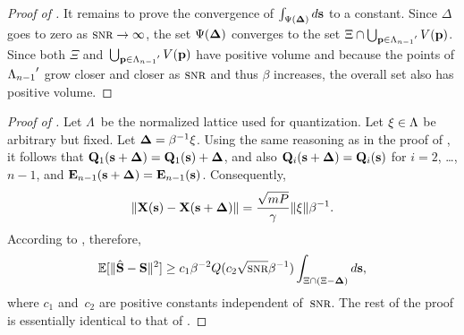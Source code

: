 \begin{subappendices}
\begin{proof}[Proof of ]
    It remains to prove the convergence of $\int_{\Psi(\mathbf{\Delta})} d\mathbf{s}$ to a constant.
    Since $\Delta$ goes to zero as $\snr \goesto \infty$, the set $\Psi(\mathbf{\Delta})$
    converges to the set $\Xi \cap \bigcup_{\mathbf{p} \in {\Lambda_{n-1}}'} V(\mathbf{p})$. Since both
    $\Xi$ and~$\bigcup_{\mathbf{p} \in {\Lambda_{n-1}}'} V(\mathbf{p})$ have positive volume and because the
    points of ${\Lambda_{n-1}}'$ grow closer and closer as $\snr$ and thus $\beta$
    increases, the overall set also has positive volume.
  \end{proof}


  \begin{proof}[Proof of ]
    Let $\Lambda$~be the normalized lattice used for quantization. Let $\mathbf{\xi} \in
    \Lambda$ be arbitrary but fixed. Let $\mathbf{\Delta} = \beta^{-1} \mathbf{\xi}$. Using the same
    reasoning as in the proof of , it follows that $\mathbf{Q}_1(\mathbf{s}
    + \mathbf{\Delta}) = \mathbf{Q}_1(\mathbf{s}) + \mathbf{\Delta}$, and also $\mathbf{Q}_i(\mathbf{s} + \mathbf{\Delta}) = \mathbf{Q}_i(\mathbf{s})$ for $i = 2$,
    \ldots, $n-1$, and $\mathbf{E}_{n-1}(\mathbf{s}+\mathbf{\Delta}) = \mathbf{E}_{n-1}(\mathbf{s})$. Consequently,
    \begin{equation*}
      \| \mathbf{X}(\mathbf{s}) - \mathbf{X}(\mathbf{s} +\mathbf{\Delta}) \| = \frac{\sqrt{mP}}{\gamma}\|\mathbf{\xi}\| \beta^{-1}.
    \end{equation*}
    According to , therefore,
    \begin{equation*}
      \msev \ge c_1 \beta^{-2} Q(c_2 \sqrt{\snr} \beta^{-1}) \int_{\Xi \cap (\Xi
      - \Dv)} d\s,
    \end{equation*}
    where $c_1$ and~$c_2$ are positive constants independent of~$\snr$.  The
    rest of the proof is essentially identical to that of
    . 
  \end{proof}

\end{subappendices}
